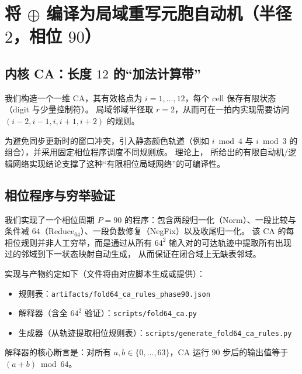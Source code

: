 \section{将 $\oplus$ 编译为局域重写元胞自动机（半径 $2$，相位 $90$）}

\subsection{内核 CA：长度 $12$ 的“加法计算带”}

我们构造一个一维 CA，其有效格点为 $i=1,\dots,12$，每个 cell 保存有限状态（digit 与少量控制符）。
局域邻域半径取 $r=2$，从而可在一拍内实现需要访问 $(i-2,i-1,i,i+1,i+2)$ 的规则。

为避免同步更新时的窗口冲突，引入静态颜色轨道（例如 $i\bmod 4$ 与 $i\bmod 3$ 的组合），并采用固定相位程序调度不同规则族。
理论上，\cite{AhlbachEtAl2013ZeckendorfArithmetic} 所给出的有限自动机/逻辑网络实现结论支撑了这种“有限相位局域网络”的可编译性。

\subsection{相位程序与穷举验证}

我们实现了一个相位周期 $P=90$ 的程序：包含两段归一化（Norm）、一段比较与条件减 $64$（Reduce$_{64}$）、一段负数修复（NegFix）以及收尾归一化。
该 CA 的每相位规则并非人工穷举，而是通过从所有 $64^2$ 输入对的可达轨迹中提取所有出现过的邻域到下一状态映射自动生成，
从而保证在闭合域上无缺表邻域。

实现与产物约定如下（文件将由对应脚本生成或提供）：
\begin{itemize}
  \item 规则表：\verb|artifacts/fold64_ca_rules_phase90.json|
  \item 解释器（含全 $64^2$ 验证）：\verb|scripts/fold64_ca.py|
  \item 生成器（从轨迹提取相位规则表）：\verb|scripts/generate_fold64_ca_rules.py|
\end{itemize}

解释器的核心断言是：对所有 $a,b\in\{0,\dots,63\}$，CA 运行 $90$ 步后的输出值等于 $(a+b)\bmod 64$。

